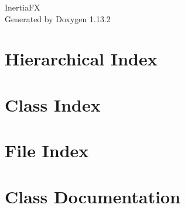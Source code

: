 \documentclass[twoside]{book}
\newcommand{\+}{\discretionary{\mbox{\scriptsize$\hookleftarrow$}}{}{}}
\newcommand{\clearemptydoublepage}{%
    \newpage{\pagestyle{empty}\cleardoublepage}%
  }
\begin{document}
  \raggedbottom
    \hypersetup{pageanchor=false,
                bookmarksnumbered=true,
                pdfencoding=unicode
               }
  \begin{titlepage}
  \vspace*{7cm}
  \begin{center}%
  {\Large Inertia\+FX}\\
  \vspace*{1cm}
  {\large Generated by Doxygen 1.13.2}\\
  \end{center}
  \end{titlepage}
  \clearemptydoublepage
  \tableofcontents
  \clearemptydoublepage
  \hypersetup{pageanchor=true}
\chapter{Hierarchical Index}

\chapter{Class Index}

\chapter{File Index}

\chapter{Class Documentation}




























\end{document}
